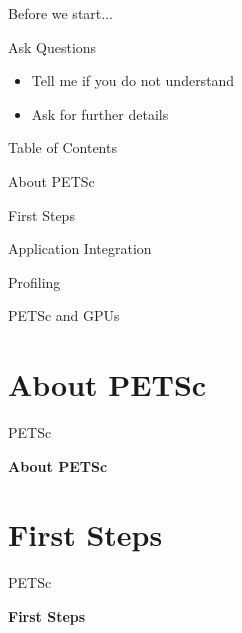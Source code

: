 

\begin{frame}{Before we start...}
   \begin{block}{Ask Questions}
    \begin{itemize}
     \item Tell me if you do not understand
     \item Ask for further details
    \end{itemize}

   \end{block}

\end{frame}



\begin{frame}{Table of Contents}
   \begin{block}{About PETSc} \end{block}
   \begin{block}{First Steps} \end{block}
   \begin{block}{Application Integration} \end{block}
   \begin{block}{Profiling} \end{block}
   \begin{block}{PETSc and GPUs} \end{block}
\end{frame}




%
%


\section{About PETSc}
\begin{frame}{PETSc}
   \begin{center} \Large \textbf{About PETSc} \end{center}
\end{frame}








\section{First Steps}
\begin{frame}{PETSc}
   \begin{center} \Large \textbf{First Steps} \end{center}
\end{frame}

